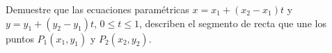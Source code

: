 \item Demuestre que las ecuaciones paramétricas $x = x_1 + (x_2 - x_1)t$ y $y = y_1 + (y_2 - y_1)t$, $0 \le t \le 1$, describen el segmento de recta que une los puntos $P_1(x_1, y_1)$ y $P_2(x_2, y_2)$.
